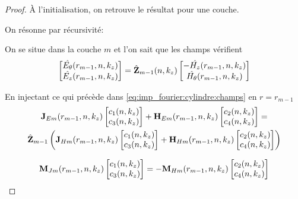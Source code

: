     \begin{proof}
      À l'initialisation, on retrouve le résultat pour une couche.

      On résonne par récursivité:

      On se situe dans la couche \(m\) et l'on sait que les champs vérifient
      \begin{equation}
        \begin{bmatrix}
          \hat{E_\theta}(r_{m-1},n,k_z)\\
          \hat{E_z}(r_{m-1},n,k_z)\\
        \end{bmatrix}
        =
        \hat {\mathbf{Z}}_{m-1}(n,k_z)
        \begin{bmatrix}
          -\hat{H_z}(r_{m-1},n,k_z)\\
          \hat{H_\theta}(r_{m-1},n,k_z)\\
        \end{bmatrix}
      \end{equation}

      En injectant ce qui précède dans \eqref{eq:imp_fourier:cylindre:champs} en \(r = r_{m-1}\)
      \begin{multline}
        \mathbf{J}_{Em}(r_{m-1},n,k_z)
        \begin{bmatrix}
          c_1(n,k_z) \\
          c_3(n,k_z)
        \end{bmatrix}
        +
        \mathbf{H}_{Em}(r_{m-1},n,k_z)
        \begin{bmatrix}
          c_2(n,k_z) \\
          c_4(n,k_z)
        \end{bmatrix}
        =
        \\
        \hat {\mathbf{Z}}_{m-1}
        \left(
          \mathbf{J}_{Hm}(r_{m-1},n,k_z)
          \begin{bmatrix}
            c_1(n,k_z) \\
            c_3(n,k_z)
          \end{bmatrix}
          +
          \mathbf{H}_{Hm}(r_{m-1},n,k_z)
          \begin{bmatrix}
            c_2(n,k_z) \\
            c_4(n,k_z)
          \end{bmatrix}
        \right)
      \end{multline}

      \begin{equation}
        \mathbf{M}_{Jm}(r_{m-1},n,k_z)
        \begin{bmatrix}
          c_1(n,k_z) \\
          c_3(n,k_z)
        \end{bmatrix}
        =
        -\mathbf{M}_{Hm}(r_{m-1},n,k_z)
        \begin{bmatrix}
          c_2(n,k_z) \\
          c_4(n,k_z)
        \end{bmatrix}
      \end{equation}


\end{proof}
